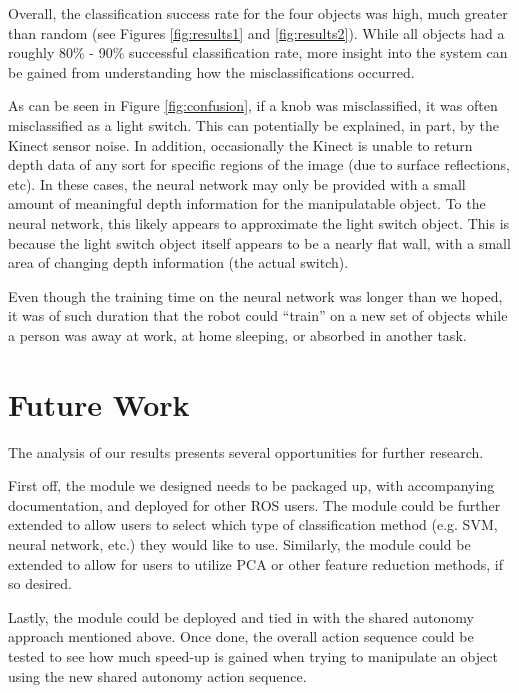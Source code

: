 \documentclass{article}
\begin{document}
Overall, the classification success rate for the four objects was high, much greater than random (see Figures \ref{fig:results1} and \ref{fig:results2}). While all objects had a roughly 80\% - 90\% successful classification rate, more insight into the system can be gained from understanding how the misclassifications occurred.

As can be seen in Figure \ref{fig:confusion}, if a knob was misclassified, it was often misclassified as a light switch. This can potentially be explained, in part, by the Kinect sensor noise. In addition, occasionally the Kinect is unable to return depth data of any sort for specific regions of the image (due to surface reflections, etc). In these cases, the neural network may only be provided with a small amount of meaningful depth information for the manipulatable object. To the neural network, this likely appears to approximate the light switch object. This is because the light switch object itself appears to be a nearly flat wall, with a small area of changing depth information (the actual switch).

Even though the training time on the neural network was longer than we hoped, it was of such duration that the robot could ``train'' on a new set of objects while a person was away at work, at home sleeping, or absorbed in another task.

\newpage

\section{Future Work}
The analysis of our results presents several opportunities for further research.

First off, the module we designed needs to be packaged up, with accompanying documentation, and deployed for other ROS users. The module could be further extended to allow users to select which type of classification method (e.g. SVM, neural network, etc.) they would like to use. Similarly, the module could be extended to 
allow for users to utilize PCA or other feature reduction methods, if so desired.

Lastly, the module could be deployed and tied in with the shared autonomy approach mentioned above. Once done, the overall action sequence could be 
tested to see how much speed-up is gained when trying to manipulate an object using the new shared autonomy action sequence.



\end{document}
